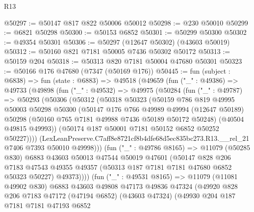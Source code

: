\begin{lexlean}{R13}
\begin{coremodule}
@50297 := @50147 @817 @822 @50006 @50012
@50298 := @230 @50010
@50299 := @6821 @50298
@50300 := @50153 @6852
@50301 := @50299 @50300
@50302 := @49354 @50301
@50306 := @50297 (@12647 @50302) (@43603 @50019)
@50312 := @50160 @821 @7181 @50005 @7436 @50302 @50172
@50313 := @50159 @204
@50318 := @50313 @820 @7181 @50004 @47680 @50301
@50323 := @50166 @176 @47680 (@7347 (@50169 @176))
@50445 := fun (subject : @6838) =>
  fun (state : @6883) =>
  @49518
    (@49659
      (fun ("_" : @49386) =>
      @49733
        (@49898
          (fun ("_" : @49532) =>
          @49975
            (@50284
              (fun ("_" : @49787) =>
              @50293
                (@50306
                  (@50312
                    (@50318
                      @50323
                      (@50159
                        @786
                        @819
                        @49995
                        @50003
                        @50298
                        @50300
                        (@50147
                          @176
                          @766
                          @49989
                          @49994
                          (@12647 @50189)
                          @50298
                          (@50160 @765 @7181 @49988 @7436 @50189 @50172 @50248)
                          (@40504 @49815 @49993))
                        (@50174 @187 @50001 @7181 @50152 @6852 @50252 @50227))))
                  (LexLeanPreserve.C7aff8e8721cf8b4dfe68d5ec835bc273.R13.__rel_21
                    @7406
                    @7393
                    @50010
                    @49998)))
              (fun ("_" : @49786 @8165) =>
              @11079
                (@50285 @830)
                @6883
                @43603
                @50013
                @47544
                @50019
                @47601
                (@50147
                  @828
                  @206
                  @7183
                  @47543
                  @49355
                  @49357
                  (@50313 @187 @7181 @7181 @47680 @6852 @50323 @50227)
                  @49373))))
          (fun ("_" : @49531 @8165) =>
          @11079
            (@11081 @49902 @830)
            @6883
            @43603
            @49808
            @47173
            @49836
            @47324
            (@49920
              @828
              @206
              @7183
              @47172
              (@47194 @6852)
              (@43603 @47324)
              (@49930
                @204
                @187
                @7181
                @7181
                @47193
                @6852

\end{coremodule}
\end{lexlean}
